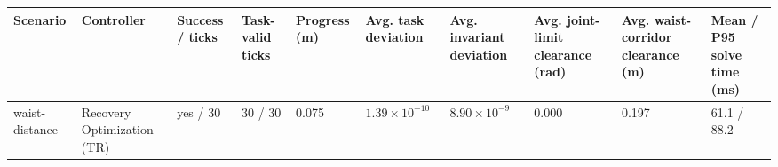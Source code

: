 \begin{tabular}{llllllllll}
\toprule
Scenario & Controller & Success / ticks & Task-valid ticks & Progress (m) & Avg. task deviation & Avg. invariant deviation & Avg. joint-limit clearance (rad) & Avg. waist-corridor clearance (m) & Mean / P95 solve time (ms) \\
\midrule
waist-distance & Recovery Optimization (TR) & yes / 30 & 30 / 30 & 0.075 & $1.39\times 10^{-10}$ & $8.90\times 10^{-9}$ & 0.000 & 0.197 & 61.1 / 88.2 \\
\bottomrule
\end{tabular}
